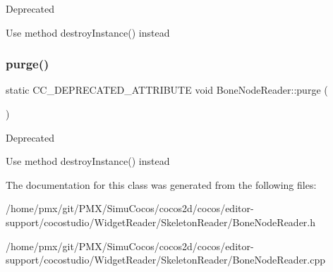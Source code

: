 \begin{DoxyRefDesc}{Deprecated}
\item[\hyperlink{deprecated__deprecated000102}{Deprecated}]Use method destroy\+Instance() instead \end{DoxyRefDesc}
\mbox{\label{classBoneNodeReader_a66289ba52e63fd281967b75781cb16bc}} 
\subsubsection{\texorpdfstring{purge()}{purge()}\hspace{0.1cm}{\footnotesize\ttfamily [2/2]}}
{\footnotesize\ttfamily static C\+C\+\_\+\+D\+E\+P\+R\+E\+C\+A\+T\+E\+D\+\_\+\+A\+T\+T\+R\+I\+B\+U\+TE void Bone\+Node\+Reader\+::purge (\begin{DoxyParamCaption}{ }\end{DoxyParamCaption})\hspace{0.3cm}{\ttfamily [static]}}

\begin{DoxyRefDesc}{Deprecated}
\item[\hyperlink{deprecated__deprecated000337}{Deprecated}]Use method destroy\+Instance() instead \end{DoxyRefDesc}


The documentation for this class was generated from the following files\+:\begin{DoxyCompactItemize}
\item 
/home/pmx/git/\+P\+M\+X/\+Simu\+Cocos/cocos2d/cocos/editor-\/support/cocostudio/\+Widget\+Reader/\+Skeleton\+Reader/Bone\+Node\+Reader.\+h\item 
/home/pmx/git/\+P\+M\+X/\+Simu\+Cocos/cocos2d/cocos/editor-\/support/cocostudio/\+Widget\+Reader/\+Skeleton\+Reader/Bone\+Node\+Reader.\+cpp\end{DoxyCompactItemize}
